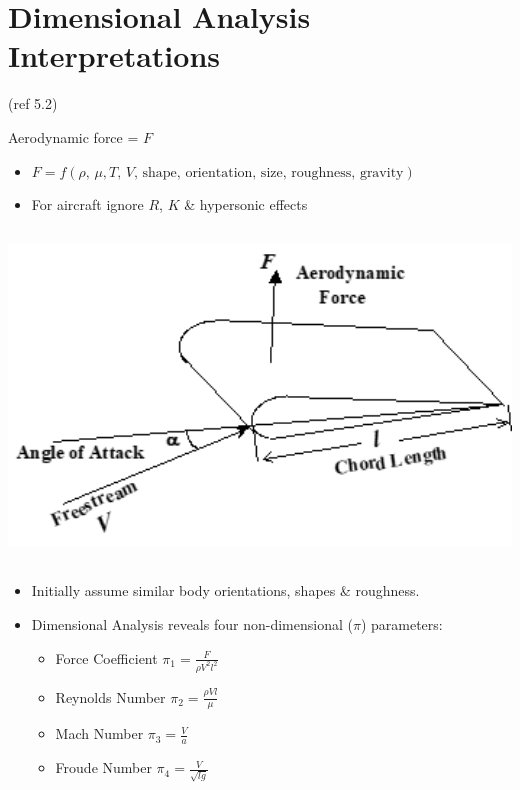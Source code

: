 \documentclass[
]{book}
\providecommand{\tightlist}{%
  \setlength{\itemsep}{0pt}\setlength{\parskip}{0pt}}
\begin{document}
\hypertarget{dimensional-analysis-interpretations}{%
\section{Dimensional Analysis Interpretations}\label{dimensional-analysis-interpretations}}

(ref 5.2)

Aerodynamic force = \(F\)

\begin{itemize}
\tightlist
\item
  \(F = f \left( \rho \text{, } \mu, T \text{, } V \text{, shape, orientation, size, roughness, gravity} \right)\)
\item
  For aircraft ignore \(R\), \(K\) \& hypersonic effects
\end{itemize}

\includegraphics[width=5.8in,height=3.481in]{media/05/image1.png}

\begin{itemize}
\tightlist
\item
  Initially assume similar body orientations, shapes \& roughness.
\item
  Dimensional Analysis reveals four non-dimensional (\(\pi\)) parameters:

  \begin{itemize}
  \tightlist
  \item
    Force Coefficient \(\pi_1 = \frac{F}{\rho V^2 l^2}\)
  \item
    Reynolds Number \(\pi_2 = \frac{\rho V l}{\mu}\)
  \item
    Mach Number \(\pi_3 = \frac{V}{a}\)
  \item
    Froude Number \(\pi_4 = \frac{V}{\sqrt{lg}}\)
  \end{itemize}
\end{itemize}
\end{document}
